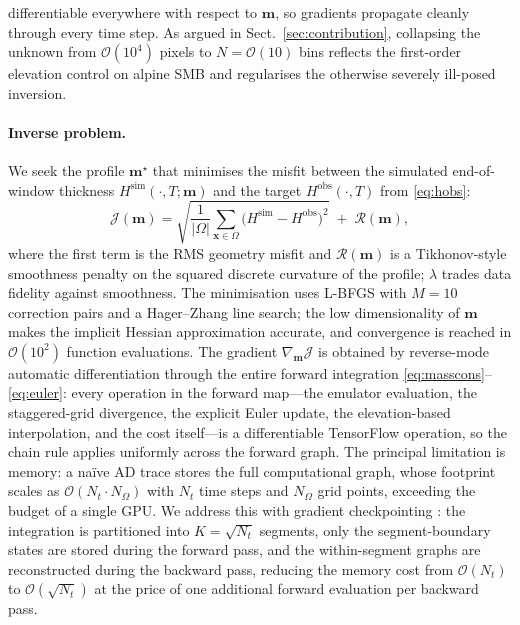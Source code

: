 differentiable everywhere with respect to $\mathbf{m}$, so
gradients propagate cleanly through every time step. As argued in
Sect.~\ref{sec:contribution},
collapsing the unknown from $\mathcal{O}(10^4)$
pixels to $N = \mathcal{O}(10)$ bins reflects the first-order elevation control on
alpine SMB and regularises the otherwise severely ill-posed inversion.

\paragraph{Inverse problem.}
We seek the profile $\mathbf{m}^\star$ that minimises the misfit between the
simulated end-of-window thickness $H^{\mathrm{sim}}(\cdot, T; \mathbf{m})$ and the
target $H^{\mathrm{obs}}(\cdot, T)$ from \eqref{eq:hobs}:
\begin{equation}
  \mathcal{J}(\mathbf{m}) =
  \sqrt{\frac{1}{|\Omega|}\sum_{\mathbf{x}\in\Omega}
    \big(H^{\mathrm{sim}} - H^{\mathrm{obs}}\big)^2}
  \;+\; \mathcal{R}(\mathbf{m}),
  \label{eq:cost}
\end{equation}
where the first term is the RMS geometry misfit and
$\mathcal{R}(\mathbf{m})$ is
a Tikhonov-style smoothness penalty on the squared discrete curvature of the
profile; $\lambda$ trades data fidelity against
smoothness. The minimisation uses L-BFGS \citep{liunocedal1989} with $M = 10$ correction pairs and
a Hager--Zhang line search; the low dimensionality of $\mathbf{m}$ makes the
implicit Hessian approximation accurate, and convergence is reached in
$\mathcal{O}(10^2)$ function evaluations. The gradient
$\nabla_{\mathbf{m}}\mathcal{J}$ is obtained by reverse-mode automatic
differentiation \citep{paszke2017} through the entire forward integration
\eqref{eq:masscons}--\eqref{eq:euler}: every operation in the forward map---the
emulator evaluation, the staggered-grid divergence, the explicit Euler update, the
elevation-based interpolation, and the cost itself---is a differentiable TensorFlow
operation, so the chain rule applies uniformly across the forward graph. The
principal limitation is memory: a naïve AD trace stores the full computational
graph, whose footprint scales as $\mathcal{O}(N_t \cdot N_\Omega)$ with $N_t$ time
steps and $N_\Omega$ grid points, exceeding the budget of a single GPU. We address
this with gradient checkpointing \citep{griewank2000}: the integration is
partitioned into $K = \sqrt{N_t}$ segments, only the segment-boundary states are
stored during the forward pass, and the within-segment graphs are reconstructed
during the backward pass, reducing the memory cost from $\mathcal{O}(N_t)$ to
$\mathcal{O}(\sqrt{N_t})$ at the price of one additional forward evaluation per
backward pass.
